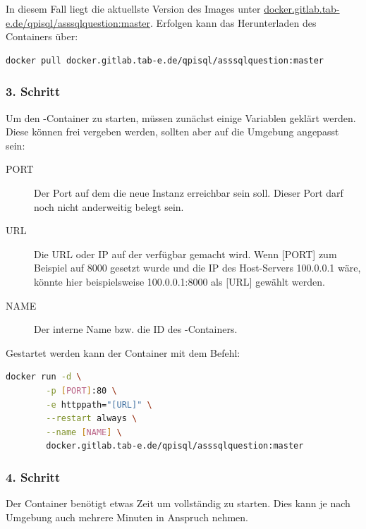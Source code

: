         In diesem Fall liegt die aktuellste Version des Images unter \url{docker.gitlab.tab-e.de/qpisql/asssqlquestion:master}. Erfolgen kann das Herunterladen des Containers über:
        
        \begin{lstlisting}[language=bash]
        docker pull docker.gitlab.tab-e.de/qpisql/asssqlquestion:master
        \end{lstlisting}
    
    \subsubsection{3. Schritt}
    
        Um den -Container zu starten, müssen zunächst einige Variablen geklärt werden. Diese können frei vergeben werden, sollten aber auf die Umgebung angepasst sein:
        
        \begin{description}
        \item[PORT]
        Der Port auf dem die neue  Instanz erreichbar sein soll. Dieser Port darf noch nicht anderweitig belegt sein.
        \item[URL] 
        Die URL oder IP auf der  verfügbar gemacht wird. Wenn [PORT] zum Beispiel auf 8000 gesetzt wurde und die IP des Host-Servers 100.0.0.1 wäre, könnte hier beispielsweise 100.0.0.1:8000 als [URL] gewählt werden.
        \item[NAME]
        Der interne Name bzw. die ID des -Containers. 
        \end{description}
        
        Gestartet werden kann der Container mit dem Befehl:
        
        \begin{lstlisting}[language=bash]
        docker run -d \
        -p [PORT]:80 \
        -e httppath="[URL]" \
        --restart always \
        --name [NAME] \
        docker.gitlab.tab-e.de/qpisql/asssqlquestion:master
        \end{lstlisting}
    
    \subsubsection{4. Schritt}
    
        Der Container benötigt etwas Zeit um vollständig zu starten. Dies kann je nach Umgebung auch mehrere Minuten in Anspruch nehmen.
    
